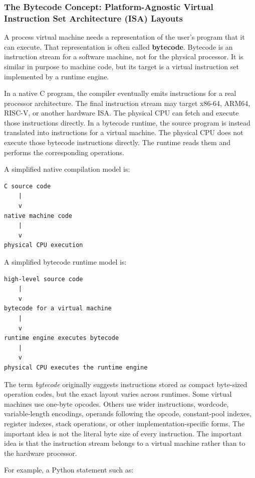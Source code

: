 \documentclass[a4paper,twoside]{report}
\begin{document}
\subsubsection{The Bytecode Concept: Platform-Agnostic Virtual Instruction Set Architecture (ISA) Layouts}

A process virtual machine needs a representation of the user's program that it can execute. That representation is often called \textbf{bytecode}. Bytecode is an instruction stream for a software machine, not for the physical processor. It is similar in purpose to machine code, but its target is a virtual instruction set implemented by a runtime engine.

In a native C program, the compiler eventually emits instructions for a real processor architecture. The final instruction stream may target x86-64, ARM64, RISC-V, or another hardware ISA. The physical CPU can fetch and execute those instructions directly. In a bytecode runtime, the source program is instead translated into instructions for a virtual machine. The physical CPU does not execute those bytecode instructions directly. The runtime reads them and performs the corresponding operations.

A simplified native compilation model is:

\begin{verbatim}
C source code
    |
    v
native machine code
    |
    v
physical CPU execution
\end{verbatim}

A simplified bytecode runtime model is:

\begin{verbatim}
high-level source code
    |
    v
bytecode for a virtual machine
    |
    v
runtime engine executes bytecode
    |
    v
physical CPU executes the runtime engine
\end{verbatim}

The term \emph{bytecode} originally suggests instructions stored as compact byte-sized operation codes, but the exact layout varies across runtimes. Some virtual machines use one-byte opcodes. Others use wider instructions, wordcode, variable-length encodings, operands following the opcode, constant-pool indexes, register indexes, stack operations, or other implementation-specific forms. The important idea is not the literal byte size of every instruction. The important idea is that the instruction stream belongs to a virtual machine rather than to the hardware processor.

For example, a Python statement such as:
\end{document}
